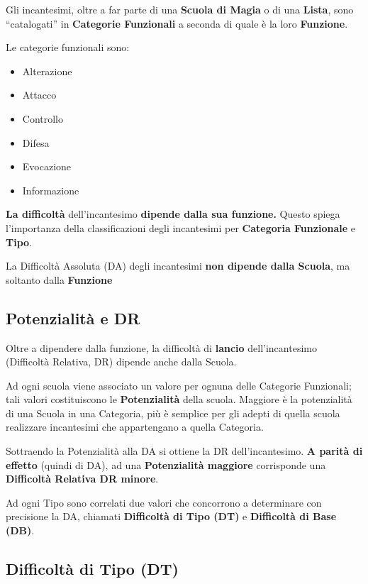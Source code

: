 Gli incantesimi, oltre a far parte di una \textbf{Scuola di Magia} o di
una \textbf{Lista}, sono ``catalogati'' in \textbf{Categorie
Funzionali} a seconda di quale \`e la loro \textbf{Funzione}.

Le categorie funzionali sono:

\begin{itemize}\itemsep -6pt
\item Alterazione
\item Attacco
\item Controllo
\item Difesa
\item Evocazione
\item Informazione
\end{itemize}

\textbf{La difficolt\`a} dell'incantesimo \textbf{dipende dalla sua funzione.}
Questo spiega l'importanza della classificazioni degli incantesimi 
per \textbf{Categoria Funzionale} e \textbf{Tipo}.

La Difficolt\`a Assoluta (DA) degli incantesimi \textbf{non dipende dalla
Scuola}, ma soltanto dalla \textbf{Funzione}

\subsection{Potenzialit\`a e DR}

Oltre a dipendere dalla funzione, la difficolt\`a di \textbf{lancio}
dell'incantesimo (Difficolt\`a Relativa, DR) dipende anche dalla
Scuola.

Ad ogni scuola viene associato un valore per ognuna delle Categorie
Funzionali; tali valori costituiscono le \textbf{Potenzialit\`a}
della scuola. Maggiore \`e la potenzialit\`a di una Scuola in una
Categoria, pi\`u \`e semplice per gli adepti di quella scuola
realizzare incantesimi che appartengano a quella Categoria.

Sottraendo la Potenzialit\`a alla DA si ottiene la DR
dell'incantesimo. \textbf{A parit\`a di effetto} (quindi di DA), ad
una \textbf{Potenzialit\`a maggiore} corrisponde una
\textbf{Difficolt\`a Relativa DR minore}.

Ad ogni Tipo sono correlati due valori che concorrono a determinare
con precisione la DA, chiamati \textbf{Difficolt\`a di Tipo (DT)} e
\textbf{Difficolt\`a di Base (DB)}.

\subsection{Difficolt\`a di Tipo (DT)} 

